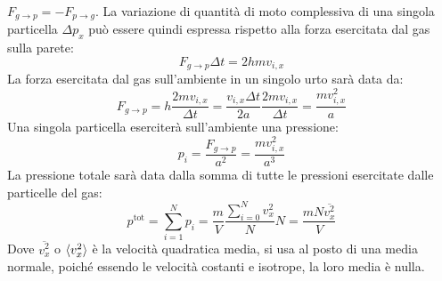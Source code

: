 \documentclass{article}
\numberwithin{equation}{subsection}
\begin{document}
$F_{g\to p}=-F_{p\to g}$. 
La variazione di quantità di moto complessiva di una singola particella $\Delta p_x$ può essere quindi espressa rispetto alla forza esercitata dal gas sulla parete: 
\begin{equation*}
    F_{g\to p}\Delta t=2hmv_{i,x}
\end{equation*}
La forza esercitata dal gas sull'ambiente in un singolo 
urto sarà data da:
\begin{equation*}
    F_{g\to p}=\displaystyle h\frac{2mv_{i,x}}{\Delta t}=\frac{v_{i,x}\Delta t}{2a}\frac{2mv_{i,x}}{\Delta t}=\frac{mv_{i,x}^2}{a}
\end{equation*} 
Una singola particella eserciterà sull'ambiente una pressione:
\begin{equation*}
    p_i=\displaystyle\frac{F_{g\to p}}{a^2}=\frac{mv_{i,x}^2}{a^3}
\end{equation*}
La pressione totale sarà data dalla somma di tutte le 
pressioni esercitate dalle particelle del gas:
\begin{equation*}
    p^\mathrm{tot}=\sum_{i=1}^{N}p_i=\displaystyle\frac{m}{V}\frac{\sum_{i=0}^Nv_x^2}{N}N=\frac{mN\overline{v_x^2}}{V}
\end{equation*}
Dove $\overline{v_x^2}$ o $\braket{v_x^2}$ è la velocità quadratica 
media, si usa al posto di una media normale, poiché essendo le 
velocità costanti e isotrope, la loro media è nulla.
\end{document}
